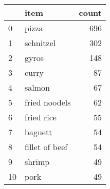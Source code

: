 \begin{tabular}{llr}
\toprule
{} &                                               item &  count \\
\midrule
0    &                                              pizza &    696 \\
1    &                                          schnitzel &    302 \\
2    &                                              gyros &    148 \\
3    &                                              curry &     87 \\
4    &                                             salmon &     67 \\
5    &                                      fried noodels &     62 \\
6    &                                         fried rice &     55 \\
7    &                                            baguett &     54 \\
8    &                                     fillet of beef &     54 \\
9    &                                             shrimp &     49 \\
10   &                                               pork &     49 \\
\bottomrule
\end{tabular}
